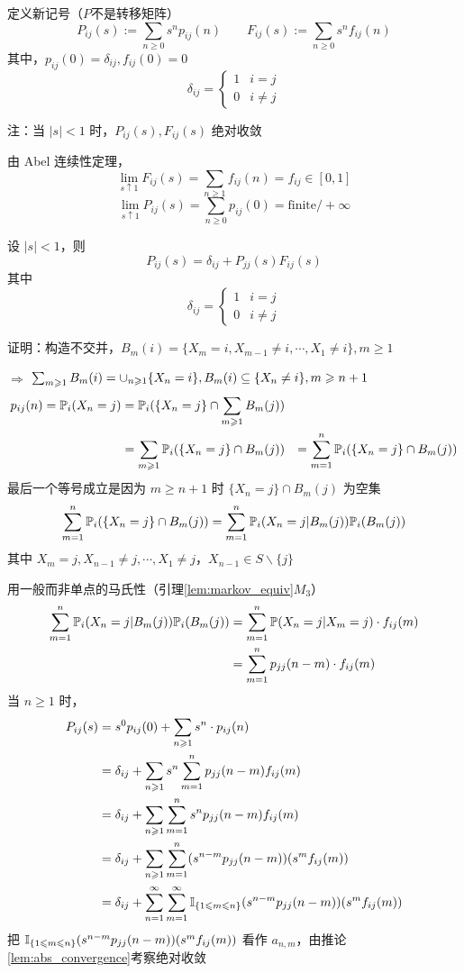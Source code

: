 定义新记号（$P$不是转移矩阵）
\[
P_{ij}(s):=\sum_{n\geq 0}s^n p_{ij}(n)\qquad F_{ij}(s):=\sum_{n\geq 0}s^n f_{ij}(n)
\]
其中，$p_{ij}(0)=\delta_{ij},f_{ij}(0)=0$
\[
\delta_{ij}=\begin{cases}
    1 & i=j\\
    0 & i\neq j
\end{cases}
\]

注：当 $|s|<1$ 时，$P_{ij}(s),F_{ij}(s)$ 绝对收敛

由 Abel 连续性定理，
\[
\lim_{s\uparrow 1}F_{ij}(s)=\sum_{n\geq 1}f_{ij}(n)=f_{ij}\in [0,1]
\]
\[
\lim_{s\uparrow 1}P_{ij}(s)=\sum_{n\geq 0}p_{ij}(0)=\text{finite}/+\infty
\]
\begin{lemma}
     设 $|s|<1$，则
    \[
    P_{ij}(s)=\delta_{ij}+P_{jj}(s)F_{ij}(s)
    \]
    其中
    \[
    \delta_{ij}=\begin{cases}
        1 & i=j\\
        0 & i\neq j
    \end{cases}
    \]
\end{lemma}

证明：构造不交并，$B_m(i)=\{X_m=i,X_{m-1}\neq i,\cdots,X_1\neq i\}, m\geq 1$

$\Rightarrow$ $\sum_{m\geqslant 1}B_m(i)=\cup_{n\geqslant 1}\{X_n=i\}, B_m(i)\subseteq \{X_n\neq i\}, m\geqslant n+1$
\[
\begin{aligned}
    p_{ij}(n)=\mathbb{P}_i(X_n=j)&=\mathbb{P}_i(\{X_n=j\}\cap \sum_{m\geqslant 1}B_m(j))\\
    &=\sum_{m\geqslant 1}\mathbb{P}_i(\{X_n=j\}\cap B_m(j))
    &=\sum_{m=1}^n\mathbb{P}_i(\{X_n=j\}\cap B_m(j))
\end{aligned}
\]
最后一个等号成立是因为 $m\geq n+1$ 时 $\{X_n=j\}\cap B_m(j)$ 为空集
\[
\sum_{m=1}^n\mathbb{P}_i(\{X_n=j\}\cap B_m(j))=\sum_{m=1}^n\mathbb{P}_i(X_n=j|B_m(j))\mathbb{P}_i(B_m(j))
\]
其中 $X_m=j,X_{n-1}\neq j,\cdots,X_1\neq j$，$X_{n-1}\in S\backslash \{j\}$

用一般而非单点的马氏性（引理\ref{lem:markov_equiv}$M_3$）
\[
\begin{aligned}
    \sum_{m=1}^n\mathbb{P}_i(X_n=j|B_m(j))\mathbb{P}_i(B_m(j))&=\sum_{m=1}^n\mathbb{P}(X_n=j|X_m=j)\cdot f_{ij}(m)\\
    &=\sum_{m=1}^n p_{jj}(n-m)\cdot f_{ij}(m)
\end{aligned}
\]
当 $n\geq 1$ 时，
\[
\begin{aligned}
    P_{ij}(s)&=s^0p_{ij}(0)+\sum_{n\geqslant 1}s^n\cdot p_{ij}(n)\\
    &=\delta_{ij}+\sum_{n\geqslant 1}s^n\sum_{m=1}^n p_{jj}(n-m)f_{ij}(m)\\
    &=\delta_{ij}+\sum_{n\geqslant 1}\sum_{m=1}^n s^n p_{jj}(n-m)f_{ij}(m)\\
    &=\delta_{ij}+\sum_{n\geqslant 1}\sum_{m=1}^n(s^{n-m}p_{jj}(n-m))(s^m f_{ij}(m))\\
    &=\delta_{ij}+\sum_{n=1}^{\infty}\sum_{m=1}^{\infty}\mathbb I_{\{1\leqslant m\leqslant n\}}(s^{n-m}p_{jj}(n-m))(s^m f_{ij}(m))
\end{aligned}
\]
把 $\mathbb I_{\{1\leqslant m\leqslant n\}}(s^{n-m}p_{jj}(n-m))(s^m f_{ij}(m))$ 看作 $a_{n,m}$，由推论\ref{lem:abs_convergence}考察绝对收敛

